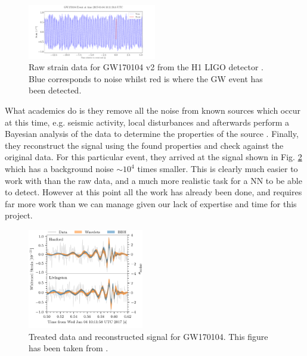 \documentclass[%
reprint,
amsmath,amssymb,
aps,
]{revtex4-2}
\begin{document}
\begin{figure}[ht!]
	\includegraphics[width=0.5\textwidth]{Figures/GW170104GWEvent.pdf}
	\caption{Raw strain data for GW170104 v2 from the H1 LIGO detector \cite{gwosc}. Blue corresponds to noise whilst red is where the GW event has been detected.}
	\label{fig:GW170104}
\end{figure}

What academics do is they remove all the noise from known sources which occur at this time, e.g. seismic activity, local disturbances and afterwards perform a Bayesian analysis of the data to determine the properties of the source \cite{LIGOScientific:2017bnn}. Finally, they reconstruct the signal using the found properties and check against the original data. For this particular event, they arrived at the signal shown in Fig. \ref{fig:GW170104Reconstructed} which has a background noise $\sim10^{4}$ times smaller. This is clearly much easier to work with than the raw data, and a much more realistic task for a NN to be able to detect. However at this point all the work has already been done, and requires far more work than we can manage given our lack of expertise and time for this project.

\begin{figure}[ht!]
	\includegraphics[width=0.45\textwidth]{Figures/GW170104_waveform_reconstructions.svg.png}
	\caption{Treated data and reconstructed signal for GW170104. This figure has been taken from \cite{LIGOScientific:2017bnn}.}
	\label{fig:GW170104Reconstructed}
\end{figure}
\end{document}
